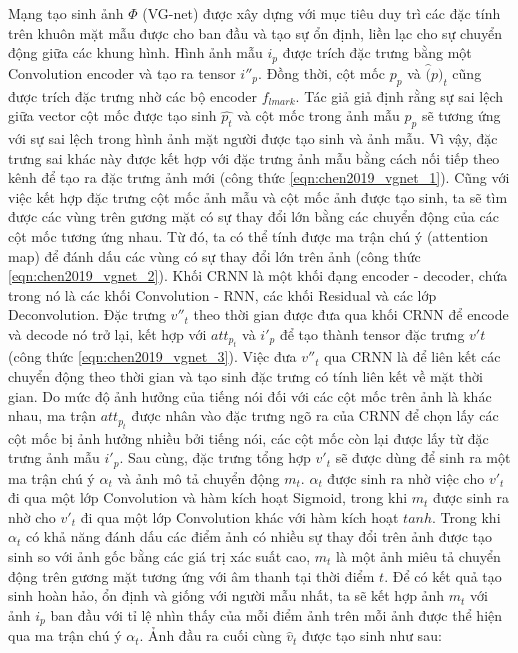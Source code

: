Mạng tạo sinh ảnh $\Phi$ (VG-net) được xây dựng với mục tiêu duy trì các đặc tính trên khuôn mặt mẫu được cho ban đầu và tạo sự ổn định, liền lạc cho sự chuyển động giữa các khung hình. Hình ảnh mẫu $i_p$ được trích đặc trưng bằng một Convolution encoder và tạo ra tensor $i''_p$. Đồng thời, cột mốc $p_p$ và $\hat(p)_t$ cũng được trích đặc trưng nhờ các bộ encoder $f_{lmark}$. Tác giả giả định rằng sự sai lệch giữa vector cột mốc được tạo sinh $\hat{p_t}$ và cột mốc trong ảnh mẫu $p_p$ sẽ tương ứng với sự sai lệch trong hình ảnh mặt người được tạo sinh và ảnh mẫu. Vì vậy, đặc trưng sai khác này được kết hợp với đặc trưng ảnh mẫu bằng cách nối tiếp theo kênh để tạo ra đặc trưng ảnh mới (công thức \ref{eqn:chen2019_vgnet_1}). Cũng với việc kết hợp đặc trưng cột mốc ảnh mẫu và cột mốc ảnh được tạo sinh, ta sẽ tìm được các vùng trên gương mặt có sự thay đổi lớn bằng các chuyển động của các cột mốc tương ứng nhau. Từ đó, ta có thể tính được ma trận chú ý (attention map) để đánh dấu các vùng có sự thay đổi lớn trên ảnh (công thức \ref{eqn:chen2019_vgnet_2}). Khối CRNN là một khối đạng encoder - decoder, chứa trong nó là các khối Convolution - RNN, các khối Residual và các lớp Deconvolution. Đặc trưng $v''_t$ theo thời gian được đưa qua khối CRNN để encode và decode nó trở lại, kết hợp với $att_{p_t}$ và $i'_p$ để tạo thành tensor đặc trưng $v't$ (công thức \ref{eqn:chen2019_vgnet_3}). Việc đưa $v''_t$ qua CRNN là để liên kết các chuyển động theo thời gian và tạo sinh đặc trưng có tính liên kết về mặt thời gian. Do mức độ ảnh hưởng của tiếng nói đối với các cột mốc trên ảnh là khác nhau, ma trận $att_{p_t}$ được nhân vào đặc trưng ngõ ra của CRNN để chọn lấy các cột mốc bị ảnh hưởng nhiều bởi tiếng nói, các cột mốc còn lại được lấy từ đặc trưng ảnh mẫu $i'_p$. Sau cùng, đặc trưng tổng hợp $v'_t$ sẽ được dùng để sinh ra một ma trận chú ý $\alpha_t$ và ảnh mô tả chuyển động $m_t$. $\alpha_t$ được sinh ra nhờ việc cho $v'_t$ đi qua một lớp Convolution và hàm kích hoạt Sigmoid, trong khi $m_t$ được sinh ra nhờ cho $v'_t$ đi qua một lớp Convolution khác với hàm kích hoạt $tanh$. Trong khi $\alpha_t$ có khả năng đánh dấu các điểm ảnh có nhiều sự thay đổi trên ảnh được tạo sinh so với ảnh gốc bằng các giá trị xác suất cao, $m_t$ là một ảnh miêu tả chuyển động trên gương mặt tương ứng với âm thanh tại thời điểm $t$. Để có kết quả tạo sinh hoàn hảo, ổn định và giống với người mẫu nhất, ta sẽ kết hợp ảnh $m_t$ với ảnh $i_p$ ban đầu với tỉ lệ nhìn thấy của mỗi điểm ảnh trên mỗi ảnh được thể hiện qua ma trận chú ý $\alpha_t$. Ảnh đầu ra cuối cùng $\hat{v}_t$ được tạo sinh như sau: 

